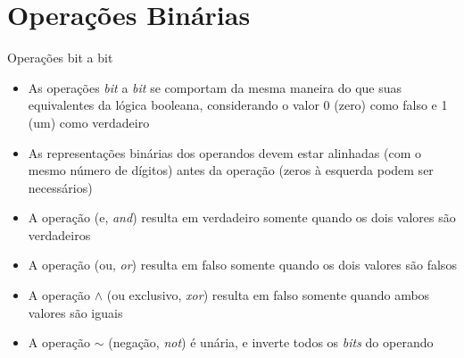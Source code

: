 \section{Operações Binárias}

\begin{frame}[fragile]{Operações bit a bit}

    \begin{itemize}
        \item As operações \textit{bit} a \textit{bit} se comportam da mesma maneira do que
            suas equivalentes da lógica booleana, considerando o valor 0 (zero) como falso e
            1 (um) como verdadeiro

        \item As representações binárias dos operandos devem estar alinhadas (com o mesmo número
            de dígitos) antes da operação (zeros à esquerda podem ser necessários)

        \item A operação  (e, \textit{and}) resulta em verdadeiro somente quando
            os dois valores são verdadeiros 

        \item A operação  (ou, \textit{or}) resulta em falso somente quando
            os dois valores são falsos

        \item A operação $\land$ (ou exclusivo, \textit{xor}) resulta em falso somente quando
            ambos valores são iguais

        \item A operação $\sim$ (negação, \textit{not}) é unária, e inverte todos os
            \textit{bits} do operando
    \end{itemize}

\end{frame}

